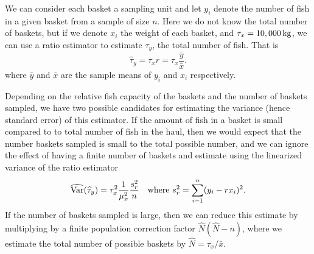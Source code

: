 \documentclass[usenames,dvipsnames]{homework}
\begin{document}


\begin{solution}
  We can consider each basket a sampling unit and let $y_i$ denote the number of fish in a given basket from a sample of size $n$.  Here we do not know the total number of baskets, but if we denote $x_i$ the weight of each basket, and $\tau_x = \unit[10,000]{\mathrm{kg}}$, we can use a ratio estimator to estimate $\tau_y$, the total number of fish.  That is
  \begin{equation*}
    \hat\tau_y = \tau_x r = \tau_x \frac{\bar y}{\bar x}.
  \end{equation*}
  where $\bar y$ and $\bar x$ are the sample means of $y_i$ and $x_i$ respectively.

  Depending on the relative fish capacity of the baskets and the number of baskets sampled, we have two possible
  candidates for estimating the variance (hence standard error) of this
  estimator.  If the amount of fish in a basket is small compared to to total
  number of fish in the haul, then we would expect that the number baskets
  sampled is small to the total possible number, and we can ignore the effect of having a finite
  number of baskets and estimate using the linearized variance of the ratio
  estimator
  \begin{equation*}
    \widehat{\mathrm{Var}}(\widehat\tau_y) = \tau_x^2 \frac 1{\mu_x^2} \frac{s_r^2}{n}\quad\text{where }s_r^2 = \sum_{i=1}^n(y_i - rx_i)^2.
  \end{equation*}
  If the number of baskets sampled is large, then we can reduce this estimate by multiplying by a finite population correction factor $\hat N(\hat N-n)$, where we estimate the total number of possible baskets by $\hat N = \tau_x / \bar x$. 
\end{solution} 
\end{document}
